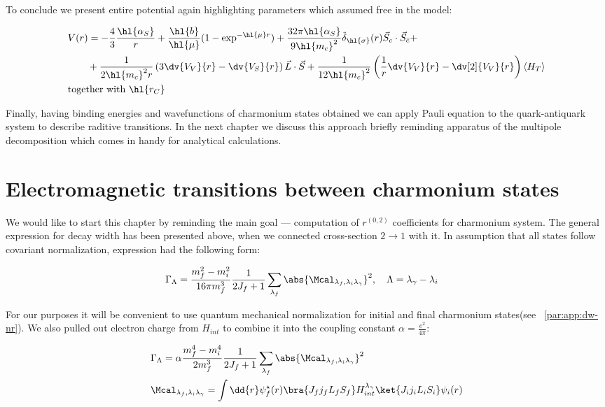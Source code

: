 To conclude we present entire potential again highlighting parameters which assumed free in the model:

\begin{align}
    &V(r) = -\frac{4}{3} \frac{\hl{\alpha_S}}{r} + \frac{\hl{b}}{\hl{\mu}} (1 - \exp^{-\hl{\mu} r}) + \frac{32 \pi \hl{\alpha_S}}{9 \hl{m_c}^2} \tilde{\delta}_{\hl{\sigma}}(r) \vec{S}_c \cdot \vec{S}_{\bar{c}} + \nonumber \\
    &\qquad+ \frac{1}{2 \hl{m_c}^2 r} \left( 3 \dv{V_V}{r} - \dv{V_S}{r} \right) \vec{L} \cdot \vec{S} + \frac{1}{12 \hl{m_c}^2} \left( \frac{1}{r} \dv{V_V}{r} - \dv[2]{V_V}{r} \right) \left<H_T\right> \nonumber \\
    &\text{together with}~\hl{r_C}
\end{align}

Finally, having binding energies and wavefunctions of charmonium states obtained we can apply Pauli equation to the quark-antiquark system to describe raditive transitions. In the next chapter we discuss this approach briefly reminding apparatus of the multipole decomposition which comes in handy for analytical calculations.

\section{Electromagnetic transitions between charmonium states}
We would like to start this chapter by reminding the main goal --- computation of $r^{(0,2)}$ coefficients for charmonium system. The general expression for decay width has been presented above, when we connected cross-section $2 \rightarrow 1$ with it. In assumption that all states follow covariant normalization, expression had the following form:

\begin{align}
    &\Gamma_{\Lambda} = \frac{m_f^2 - m_i^2}{16 \pi m_f^3} \frac{1}{2J_f + 1} \sum_{\lambda_f} \abs{\Mcal_{\lambda_f, \lambda_i \lambda_\gamma}}^2, \quad \Lambda = \lambda_\gamma - \lambda_i
\end{align}

For our purposes it will be convenient to use quantum mechanical normalization for initial and final charmonium states(see ~\cref{par:app:dw-nr}). We also pulled out electron charge from $H_{int}$ to combine it into the coupling constant $\alpha = \frac{e^2}{4 \pi}$: 

\begin{align}
    &\Gamma_{\Lambda} = \alpha \frac{m_f^4 - m_i^4}{2 m_f^3} \frac{1}{2J_f + 1} \sum_{\lambda_f} \abs{\Mcal_{\lambda_f, \lambda_i \lambda_\gamma}}^2 \label{eq:dw-nr} \\
    &\Mcal_{\lambda_f, \lambda_i \lambda_\gamma} = \int \dd{r} \psi_f^\star(r) \bra{J_f j_f L_f S_f} H_{int}^{\lambda_\gamma} \ket{J_i j_i L_i S_i} \psi_i(r) \label{eq:mel-nr}
\end{align}


